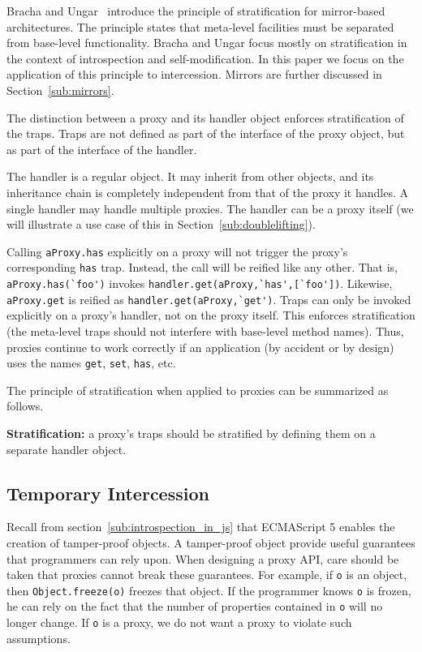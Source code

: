 \documentclass{sig-alternate}
\begin{document}
Bracha and Ungar~\cite{bracha04mirrors} introduce the principle of stratification for mirror-based architectures. The principle states that meta-level facilities must be separated from base-level functionality. Bracha and Ungar focus mostly on stratification in the context of introspection and self-modification. In this paper we focus on the application of this principle to intercession. Mirrors are further discussed in Section~\ref{sub:mirrors}.

The distinction between a proxy and its handler object enforces stratification of the traps. Traps are not defined as part of the interface of the proxy object, but as part of the interface of the handler.

The handler is a regular object. It may inherit from other objects, and its inheritance chain is completely independent from that of the proxy it handles. A single handler may handle multiple proxies. The handler can be a proxy itself (we will illustrate a use case of this in Section~\ref{sub:doublelifting}).

Calling \lstinline{aProxy.has} explicitly on a proxy will not trigger the proxy's corresponding \texttt{has} trap. Instead, the call will be reified like any other. That is, \lstinline{aProxy.has(`foo')} invokes \lstinline{handler.get(aProxy,`has',[`foo'])}. Likewise, \lstinline{aProxy.get} is reified as \lstinline{handler.get(aProxy,`get')}. Traps can only be invoked explicitly on a proxy's handler, not on the proxy itself. This enforces stratification (the meta-level traps should not interfere with base-level method names). Thus, proxies continue to work correctly if an application (by accident or by design) uses the names \texttt{get}, \texttt{set}, \texttt{has}, etc.

The principle of stratification when applied to proxies can be summarized as follows.

\textbf{Stratification:} a proxy's traps should be stratified by defining them on a separate handler object.

\subsection{Temporary Intercession}
\label{sub:immutability}

Recall from section~\ref{sub:introspection_in_js} that ECMAScript 5 enables the creation of tamper-proof objects. A tamper-proof object provide useful guarantees that programmers can rely upon. When designing a proxy API, care should be taken that proxies cannot break these guarantees. For example, if \texttt{o} is an object, then \texttt{Object.freeze(o)} freezes that object. If the programmer knows \texttt{o} is frozen, he can rely on the fact that the number of properties contained in \texttt{o} will no longer change. If \texttt{o} is a proxy, we do not want a proxy to violate such assumptions.
\end{document}

